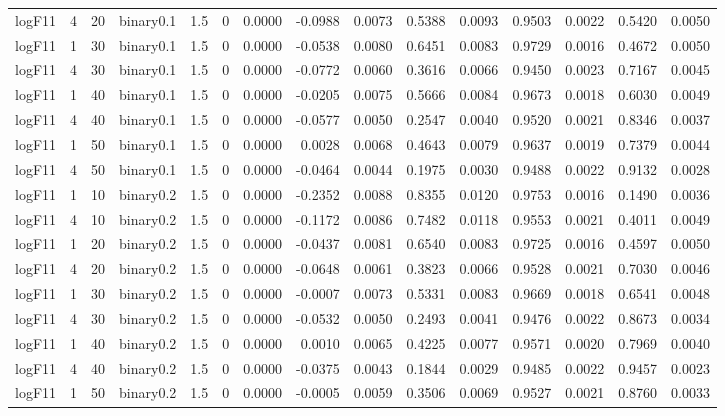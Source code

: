 \begin{longtable}{rrrrrrrrrrrrrrr}
  logF11 & 4 & 20 & binary0.1 & 1.5 & 0 & 0.0000 & -0.0988 & 0.0073 & 0.5388 & 0.0093 & 0.9503 & 0.0022 & 0.5420 & 0.0050 \\ 
  logF11 & 1 & 30 & binary0.1 & 1.5 & 0 & 0.0000 & -0.0538 & 0.0080 & 0.6451 & 0.0083 & 0.9729 & 0.0016 & 0.4672 & 0.0050 \\ 
  logF11 & 4 & 30 & binary0.1 & 1.5 & 0 & 0.0000 & -0.0772 & 0.0060 & 0.3616 & 0.0066 & 0.9450 & 0.0023 & 0.7167 & 0.0045 \\ 
  logF11 & 1 & 40 & binary0.1 & 1.5 & 0 & 0.0000 & -0.0205 & 0.0075 & 0.5666 & 0.0084 & 0.9673 & 0.0018 & 0.6030 & 0.0049 \\ 
  logF11 & 4 & 40 & binary0.1 & 1.5 & 0 & 0.0000 & -0.0577 & 0.0050 & 0.2547 & 0.0040 & 0.9520 & 0.0021 & 0.8346 & 0.0037 \\ 
  logF11 & 1 & 50 & binary0.1 & 1.5 & 0 & 0.0000 & 0.0028 & 0.0068 & 0.4643 & 0.0079 & 0.9637 & 0.0019 & 0.7379 & 0.0044 \\ 
  logF11 & 4 & 50 & binary0.1 & 1.5 & 0 & 0.0000 & -0.0464 & 0.0044 & 0.1975 & 0.0030 & 0.9488 & 0.0022 & 0.9132 & 0.0028 \\ 
  logF11 & 1 & 10 & binary0.2 & 1.5 & 0 & 0.0000 & -0.2352 & 0.0088 & 0.8355 & 0.0120 & 0.9753 & 0.0016 & 0.1490 & 0.0036 \\ 
  logF11 & 4 & 10 & binary0.2 & 1.5 & 0 & 0.0000 & -0.1172 & 0.0086 & 0.7482 & 0.0118 & 0.9553 & 0.0021 & 0.4011 & 0.0049 \\ 
  logF11 & 1 & 20 & binary0.2 & 1.5 & 0 & 0.0000 & -0.0437 & 0.0081 & 0.6540 & 0.0083 & 0.9725 & 0.0016 & 0.4597 & 0.0050 \\ 
  logF11 & 4 & 20 & binary0.2 & 1.5 & 0 & 0.0000 & -0.0648 & 0.0061 & 0.3823 & 0.0066 & 0.9528 & 0.0021 & 0.7030 & 0.0046 \\ 
  logF11 & 1 & 30 & binary0.2 & 1.5 & 0 & 0.0000 & -0.0007 & 0.0073 & 0.5331 & 0.0083 & 0.9669 & 0.0018 & 0.6541 & 0.0048 \\ 
  logF11 & 4 & 30 & binary0.2 & 1.5 & 0 & 0.0000 & -0.0532 & 0.0050 & 0.2493 & 0.0041 & 0.9476 & 0.0022 & 0.8673 & 0.0034 \\ 
  logF11 & 1 & 40 & binary0.2 & 1.5 & 0 & 0.0000 & 0.0010 & 0.0065 & 0.4225 & 0.0077 & 0.9571 & 0.0020 & 0.7969 & 0.0040 \\ 
  logF11 & 4 & 40 & binary0.2 & 1.5 & 0 & 0.0000 & -0.0375 & 0.0043 & 0.1844 & 0.0029 & 0.9485 & 0.0022 & 0.9457 & 0.0023 \\ 
  logF11 & 1 & 50 & binary0.2 & 1.5 & 0 & 0.0000 & -0.0005 & 0.0059 & 0.3506 & 0.0069 & 0.9527 & 0.0021 & 0.8760 & 0.0033 \\ 

\end{longtable}

